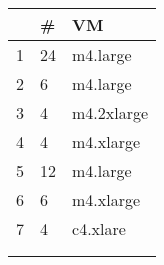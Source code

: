 {\scriptsize
\begin{tabular}{@{}lll@{}}
\toprule
     & \#     & VM         \\ \midrule
1    & 24     & m4.large  \\
2    & 6      & m4.large   \\
3    & 4      & m4.2xlarge   \\
4    & 4      & m4.xlarge \\
5    & 12     & m4.large   \\
6    & 6      & m4.xlarge   \\
7    & 4      & c4.xlare  \\
     &        &            \\
     &        &            \\ \bottomrule
\end{tabular}
}
